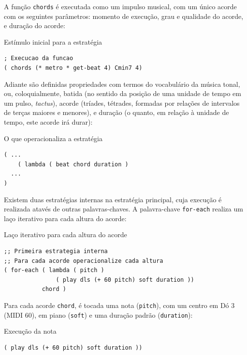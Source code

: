 A função \verb|chords| é executada como um impulso musical, com um único acorde com os seguintes parâmetros: momento de execução, grau e qualidade do acorde, e duração do acorde:

\begin{example}{Estímulo inicial para a estratégia}
\begin{verbatim}
; Execucao da funcao
( chords (* metro * get-beat 4) Cmin7 4)
\end{verbatim}
\end{example}


Adiante são definidas propriedades com termos do vocabulário da música tonal, ou, coloquialmente, batida (no sentido da posição de uma unidade de tempo em um pulso, \emph{tactus}), acorde (tríades, tétrades, formadas por relações de intervalos de terças maiores e menores), e duração (o quanto, em relação à unidade de tempo, este acorde irá durar):

\begin{example}{O que operacionaliza a estratégia}
\begin{verbatim}
( ...
    ( lambda ( beat chord duration )
  ...
)    
\end{verbatim}
\end{example}

Existem duas estratégias internas na estratégia principal, cuja execução é realizada atavés de outras palavras-chaves. A palavra-chave \verb|for-each| realiza um laço iterativo para cada altura do acorde:

\begin{example}{Laço iterativo para cada altura do acorde}
\begin{verbatim}
;; Primeira estrategia interna 
;; Para cada acorde operacionalize cada altura
( for-each ( lambda ( pitch )
               ( play dls (+ 60 pitch) soft duration ))
           chord )
\end{verbatim}
\end{example}

Para cada acorde \verb|chord|, é tocada uma nota (\verb|pitch|), com um centro em Dó 3 (MIDI 60), em piano (\verb|soft|) e uma duração padrão (\verb|duration|):

\begin{example}{Execução da nota}
\begin{verbatim}
( play dls (+ 60 pitch) soft duration ))
\end{verbatim}
\end{example}

